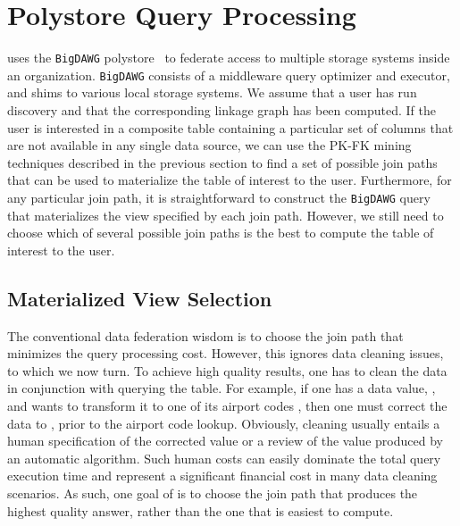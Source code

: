 \section{Polystore Query Processing}
\label{sec:curating}

\dcv uses the \texttt{BigDAWG}
polystore~\cite{DBLP:journals/pvldb/ElmoreDSBCGHHKK15} to federate access to
multiple storage systems inside an organization. \texttt{BigDAWG} consists of a
middleware query optimizer and executor, and shims to various local storage
systems. We assume that a user has run discovery and that the corresponding
linkage graph has been computed.  If the user is interested in a composite table
containing a particular set of columns that are not available in any single data
source,  we can use the PK-FK mining techniques described in the previous
section to find a set of possible join paths that can be used to materialize the
table of interest to the user. Furthermore, for any particular join path, it is
straightforward to construct the \texttt{BigDAWG} query that materializes the
view specified by each join path. However, we still need to choose which of
several possible join paths is the best to compute the table of interest to the
user.
	



\subsection{Materialized View Selection}

The conventional data federation wisdom is to choose the join path that minimizes the query processing cost. However, this ignores data cleaning issues, to which we now turn. To achieve high quality results, one has to clean the data in conjunction with querying the table. For example, if one has a data value, , and wants to transform it to one of its airport codes , then one must correct the data to , prior to the airport code lookup. Obviously, cleaning usually entails a human specification of the corrected value or a review of the value produced by an automatic algorithm. Such human costs can easily dominate the total query execution time and represent a significant financial cost in many data cleaning scenarios.
As such, one goal of \dcv is to choose the join path that produces the highest quality answer, rather than the one that is easiest to compute. 


